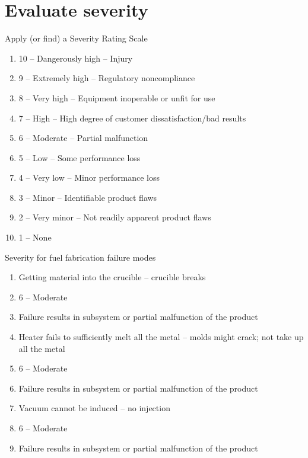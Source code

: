 \documentclass[aspectratio=1610,pdftex,dvipsnames,compress,xcolor={dvipsnames}]{beamer}
\begin{document}
\section{Evaluate severity}


\addtocounter{framenumber}{-1}
\begin{frame}{Apply (or find) a Severity Rating Scale}
    \begin{enumerate}[series=outerlist,topsep=0pt,itemsep=3pt,leftmargin=*,label=(\arabic*)]
        \item[]10 -- Dangerously high -- Injury
        \item[]9 -- Extremely high -- Regulatory noncompliance
        \item[]8 -- Very high -- Equipment inoperable or unfit for use
        \item[]7 -- High -- High degree of customer dissatisfaction/bad results 
        \item[]6 -- Moderate -- Partial malfunction
        \item[]5 -- Low -- Some performance loss
        \item[]4 -- Very low -- Minor performance loss
        \item[]3 -- Minor -- Identifiable product flaws
        \item[]2 -- Very minor -- Not readily apparent product flaws
        \item[]1 -- None 
    \end{enumerate}
\end{frame}


\begin{frame}{Severity for fuel fabrication failure modes}
    \begin{enumerate}[series=outerlist,topsep=0pt,itemsep=3pt,leftmargin=*,label=(\arabic*)]
        \item[]Getting material into the crucible -- crucible breaks
        \item[]6 -- Moderate
        \item[]Failure results in subsystem or partial malfunction of the product
            \vspace{0.10in}
        \item[]Heater fails to sufficiently melt all the metal -- molds might crack; not take up all the metal
        \item[]6 -- Moderate
        \item[]Failure results in subsystem or partial malfunction of the product
            \vspace{0.10in}
        \item[]Vacuum cannot be induced -- no injection
        \item[]6 -- Moderate
        \item[]Failure results in subsystem or partial malfunction of the product
    \end{enumerate}
\end{frame}
\end{document}
